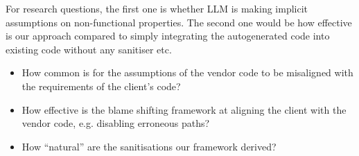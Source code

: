For research questions, the first one is whether LLM is making implicit assumptions on non-functional properties. The second one would be how effective is our approach compared to simply integrating the autogenerated code into existing code without any sanitiser etc. 
\begin{itemize}
    \item How common is for the assumptions of the vendor code to be misaligned with the requirements of the client's code?
    \item How effective is the blame shifting framework at aligning the client with the vendor code, e.g. disabling erroneous paths?
    \item How ``natural'' are the sanitisations our framework derived?  
\end{itemize}

